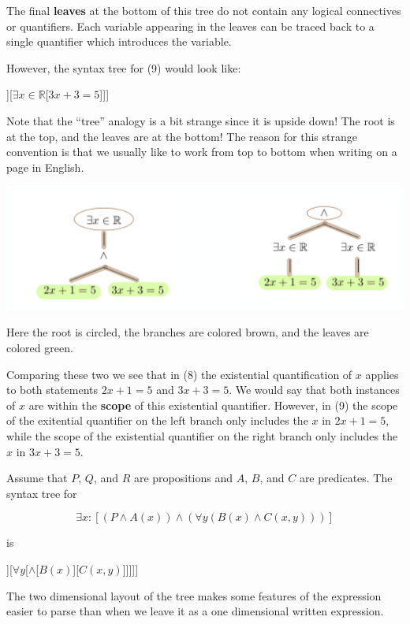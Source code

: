 The  final \textbf{leaves} at the bottom of this tree do not contain any logical connectives or quantifiers.  Each variable appearing in the leaves can be traced back to a single quantifier which introduces the variable.

However, the syntax tree for (9) would look like:

\begin{center}
	\begin{forest}
		[\(\wedge\)[\(\exists x \in \mathbb{R}\)[\( {2x+1 = 5}\)]][\(\exists x \in \mathbb{R}\)[\( {3x+3 = 5}\)]]]
	\end{forest}
\end{center}

Note that the ``tree'' analogy is a bit strange since it is upside down!  The root is at the top, and the leaves are at the bottom!  The reason for this strange convention is that we usually like to work from top to bottom when writing on a page in English.

\includegraphics[scale = 0.4]{trees}

Here the root is circled, the branches are colored brown, and the leaves are colored green.

Comparing these two we see that in (8) the existential quantification of $x$ applies to both statements $2x+1 = 5$ and $3x+3  = 5$.  We would say that both instances of $x$ are within the \textbf{scope} of this existential quantifier.  However, in (9) the scope of the exitential quantifier on the left branch only includes the $x$ in $2x+1  = 5$, while the scope of the existential quantifier on the right branch only includes the $x$ in $3x+3 = 5$.

\begin{example}
	Assume that $P$, $Q$, and $R$ are propositions and $A$, $B$, and $C$ are predicates. The syntax tree for 
	
	\[
	\exists x :[( P \wedge A(x)) \wedge ( \forall y( B(x) \wedge C(x,y) ))]
	\]
	
	is
	
	\begin{center}
		\begin{forest}
			[\(\exists x\)[\(\wedge\)[\(\wedge\)[\(P\)][\(A(x)\)]][\(\forall y \)[\(\wedge\)[\(B(x)\)][\({C(x,y)}\)]]]]]
		\end{forest}
	\end{center}
	
	The two dimensional layout of the tree makes some features of the expression easier to parse than when we leave it as a one dimensional written expression.
\end{example}



